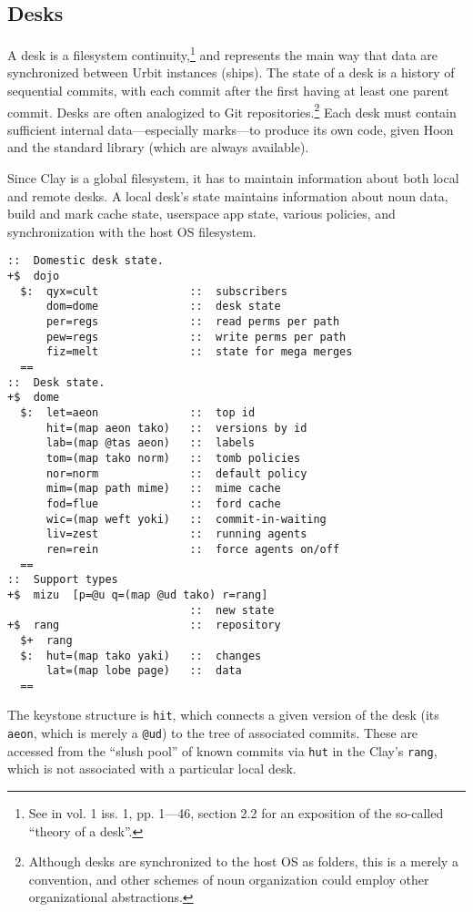 \documentclass[twoside]{article}
\begin{document}
\subsection{Desks}

A desk is a filesystem continuity,\footnote{See \citet{Blackman2024} in  vol. 1 iss. 1, pp. 1—46, section 2.2 for an exposition of the so-called ``theory of a desk''.} and represents the main way that data are synchronized between Urbit instances (ships).  The state of a desk is a history of sequential commits, with each commit after the first having at least one parent commit.  Desks are often analogized to Git repositories.\footnote{Although desks are synchronized to the host OS as folders, this is a merely a convention, and other schemes of noun organization could employ other organizational abstractions.}  Each desk must contain sufficient internal data—especially marks—to produce its own code, given Hoon and the standard library (which are always available).

Since Clay is a global filesystem, it has to maintain information about both local and remote desks.  A local desk's state maintains information about noun data, build and mark cache state, userspace app state, various policies, and synchronization with the host OS filesystem.

\begin{lstlisting}[caption={Clay desk types},
                   style=listingcode]
::  Domestic desk state.
+$  dojo
  $:  qyx=cult              ::  subscribers
      dom=dome              ::  desk state
      per=regs              ::  read perms per path
      pew=regs              ::  write perms per path
      fiz=melt              ::  state for mega merges
  ==
::  Desk state.
+$  dome
  $:  let=aeon              ::  top id
      hit=(map aeon tako)   ::  versions by id
      lab=(map @tas aeon)   ::  labels
      tom=(map tako norm)   ::  tomb policies
      nor=norm              ::  default policy
      mim=(map path mime)   ::  mime cache
      fod=flue              ::  ford cache
      wic=(map weft yoki)   ::  commit-in-waiting
      liv=zest              ::  running agents
      ren=rein              ::  force agents on/off
  ==
::  Support types
+$  mizu  [p=@u q=(map @ud tako) r=rang]
                            ::  new state
+$  rang                    ::  repository
  $+  rang
  $:  hut=(map tako yaki)   ::  changes
      lat=(map lobe page)   ::  data
  ==
\end{lstlisting}

The keystone structure is \texttt{hit}, which connects a given version of the desk (its \texttt{aeon}, which is merely a \texttt{@ud}) to the tree of associated commits.  These are accessed from the ``slush pool'' of known commits via \texttt{hut} in the Clay's \texttt{rang}, which is not associated with a particular local desk.
\end{document}
